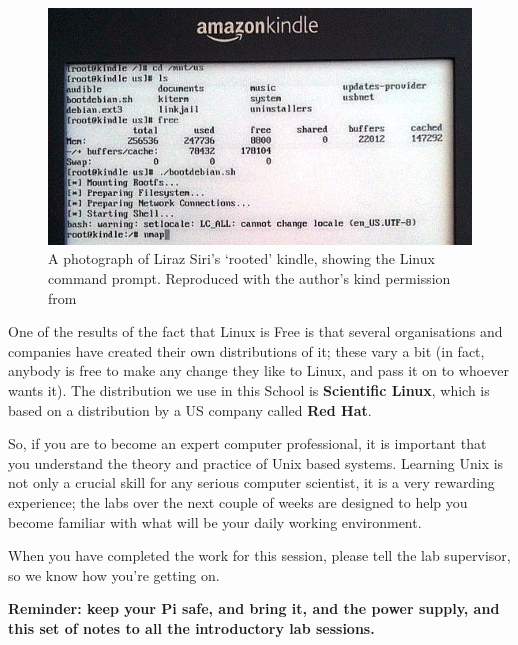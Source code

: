 \begin{figure}
  \begin{center}
    \includegraphics[width=13cm]{images/kindleroot}
  \end{center}
\caption{A photograph of Liraz Siri's `rooted' kindle, showing the Linux command prompt. Reproduced with the author's kind permission from }
\label{fig:kindlelinux}
\end{figure}

One of the results of the fact that Linux is Free is that several
organisations and companies have created their own distributions of
it; these vary a bit (in fact, anybody is free to make any change they
like to Linux, and pass it on to whoever wants it). The distribution
we use in this School is \textbf{Scientific Linux}, which is
based on a distribution by a
US company called \textbf{Red Hat}.

So, if you are to become an expert computer professional, it is
important that you understand the theory and practice of Unix based
systems. Learning Unix is not only a crucial skill for any serious
computer scientist, it is a very rewarding experience; the labs over
the next couple of weeks are designed to help you become familiar with what will be your daily working environment.

When you have completed the work for this session, please tell the lab
supervisor, so we know how you're getting on.

\textbf{Reminder: keep your Pi safe, and bring it, and the power supply, and
  this set of notes to all the introductory lab sessions.}
